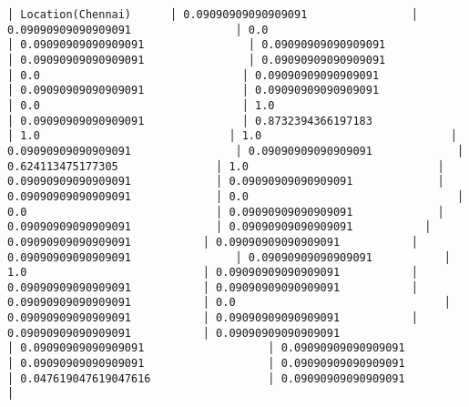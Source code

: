 \documentclass[11pt]{article}
\begin{document}
\begin{Verbatim}[commandchars=\\\{\}]
│ Location(Chennai)      │ 0.09090909090909091                │ 0.09090909090909091                │ 0.0                                │ 0.09090909090909091                │ 0.09090909090909091                │ 0.09090909090909091                │ 0.09090909090909091                │ 0.0                               │ 0.09090909090909091               │ 0.09090909090909091               │ 0.09090909090909091                │ 0.0                               │ 1.0                               │ 0.09090909090909091               │ 0.8732394366197183              │ 1.0                             │ 1.0                             │ 0.09090909090909091                │ 0.09090909090909091             │ 0.624113475177305               │ 1.0                             │ 0.09090909090909091             │ 0.09090909090909091             │ 0.09090909090909091             │ 0.0                                │ 0.0                             │ 0.09090909090909091             │ 0.09090909090909091             │ 0.09090909090909091           │ 0.09090909090909091           │ 0.09090909090909091           │ 0.09090909090909091                │ 0.09090909090909091           │ 1.0                           │ 0.09090909090909091           │ 0.09090909090909091           │ 0.09090909090909091           │ 0.09090909090909091           │ 0.0                                │ 0.09090909090909091           │ 0.09090909090909091           │ 0.09090909090909091           │ 0.09090909090909091                   │ 0.09090909090909091                   │ 0.09090909090909091                   │ 0.09090909090909091                   │ 0.09090909090909091                   │ 0.047619047619047616                  │ 0.09090909090909091                   │

\end{Verbatim}
\end{document}

